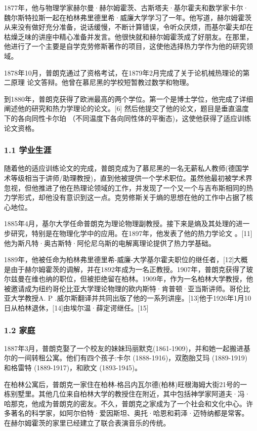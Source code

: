 1877年，他与物理学家赫尔曼·赫尔姆霍茨、古斯塔夫·基尔霍夫和数学家卡尔·魏尔斯特拉斯一起在柏林弗里德里希·威廉大学学习了一年。他写道，赫尔姆霍茨从来没有做好充分准备，说话缓慢，不断计算错误，令听众厌烦，而基尔霍夫却在枯燥乏味的讲座中精心准备并发言。他很快就和赫尔姆霍茨成了好朋友。在那里，他进行了一个主要是自学克劳修斯著作的项目，这使他选择热力学作为他的研究领域。

1878年10月，普朗克通过了资格考试，在1879年2月完成了关于论机械热理论的第二原理 论文答辩。他曾在慕尼黑的学校短暂教过数学和物理。

到1880年，普朗克获得了欧洲最高的两个学位。第一个是博士学位，他完成了详细阐述他的研究和热力学理论的论文。[6] 然后他提交了他的论文，题目是垂直温度下的各向同性卡尔珀 （不同温度下各向同性体的平衡态)，这使他获得了适应训练论文资格。

\subsubsection{1.1 学业生涯}
随着他的适应训练论文的完成，普朗克成为了慕尼黑的一名无薪私人教师(德国学术等级相当于讲师/助理教授)，直到他被提供一个学术职位。虽然他最初被学术界忽视，但他推进了他在热理论领域的工作，并发现了一个又一个与吉布斯相同的热力学形式，却他没有意识到这一点。克劳修斯关于熵的思想在他的工作中占据了核心地位。

1885年4月，基尔大学任命普朗克为理论物理副教授。接下来是熵及其处理的进一步研究，特别是在物理化学中的应用。在1897年，他发表了他的热力学论文 。[11]他为斯凡特·奥古斯特·阿伦尼乌斯的电解离理论提供了热力学基础。

1889年，他被任命为柏林弗里德里希-威廉-大学基尔霍夫职位的继任者，[12]大概是由于赫尔姆霍茨的调解，并在1892年成为一名正教授。1907年，普朗克获得了玻尔兹曼在维也纳的职位，但被拒绝留在柏林。1909年，作为一名柏林大学教授，他被邀请成为纽约哥伦比亚大学理论物理的欧内斯特·肯普顿·亚当斯讲师。哥伦比亚大学教授A. P .威尔斯翻译并共同出版了他的一系列讲座。[13]他于1926年1月10日从柏林退休，[14]由埃尔温·薛定谔继任。[15]

\subsubsection{1.2 家庭}
1887年3月，普朗克娶了一个校友的妹妹玛丽默克(1861-1909)，并和她一起搬进基尔的一间转租公寓。他们有四个孩子:卡尔 (1888-1916)，双胞胎艾玛 (1889-1919)和格雷特 (1889-1917)，和欧文 (1893-1945)。

在柏林公寓后，普朗克一家住在柏林-格吕内瓦尔德(柏林)旺根海姆大街21号的一栋别墅里。其他几位来自柏林大学的教授住在附近，其中包括神学家阿道夫·冯·哈那克，他成为普朗克的密友。不久，普朗克之家成为了一个社会和文化中心。许多著名的科学家，如阿尔伯特·爱因斯坦、奥托·哈恩和莉泽·迈特纳都是常客。在赫尔姆霍茨的家里已经建立了联合表演音乐的传统。

